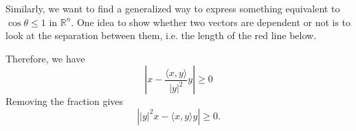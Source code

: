 \begin{itemize}
\begin{idea}
              Similarly, we want to find a generalized way to express something equivalent to $\cos\theta \le 1$ in $\mathbb{R}^n$. One idea to show whether two vectors are dependent or not is to look at the separation between them, i.e. the length of the red line below.
              \begin{center}
              \end{center}
              Therefore, we have
              \begin{equation}
                  \left|x-\frac{\langle x,y\rangle}{|y|^2}y\right| \ge 0
              \end{equation}
              Removing the fraction gives
              \begin{equation}
                  \left||y|^2x-\langle x,y\rangle y\right| \ge 0.
              \end{equation}
          \end{idea}
\end{itemize}